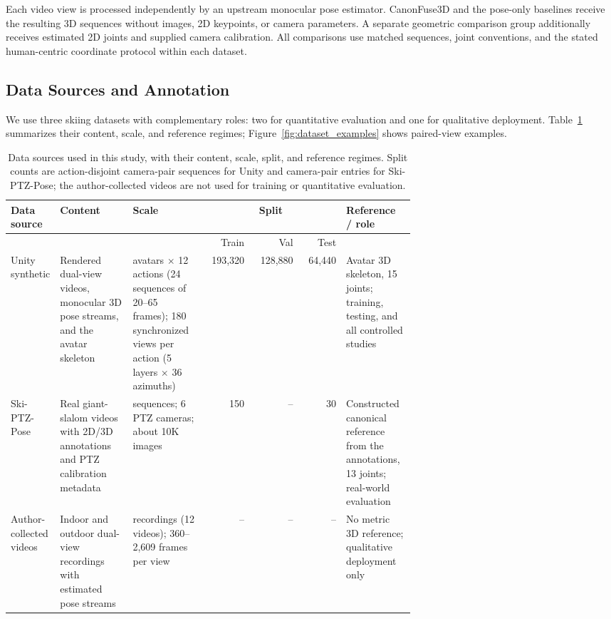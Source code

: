 \documentclass[preprint,12pt]{elsarticle}
\begin{document}
Each video view is processed independently by an upstream monocular pose estimator. CanonFuse3D and the pose-only baselines receive the resulting 3D sequences without images, 2D keypoints, or camera parameters. A separate geometric comparison group additionally receives estimated 2D joints and supplied camera calibration. All comparisons use matched sequences, joint conventions, and the stated human-centric coordinate protocol within each dataset.

\subsection{Data Sources and Annotation}
\label{subsec:dataset_annotation}

We use three skiing datasets with complementary roles: two for quantitative evaluation and one for qualitative deployment. Table~\ref{tab:dataset_summary} summarizes their content, scale, and reference regimes; Figure~\ref{fig:dataset_examples} shows paired-view examples.

\begin{table}[!htb]
\centering
\caption{Data sources used in this study, with their content, scale, split, and reference regimes. Split counts are action-disjoint camera-pair sequences for Unity and camera-pair entries for Ski-PTZ-Pose; the author-collected videos are not used for training or quantitative evaluation.}
\label{tab:dataset_summary}
\footnotesize
\setlength{\tabcolsep}{3pt}
\renewcommand{\arraystretch}{1.08}
\begin{tabular}{@{}>{\raggedright\arraybackslash}p{0.125\linewidth}
                >{\raggedright\arraybackslash}p{0.18\linewidth}
                >{\raggedright\arraybackslash}p{0.18\linewidth}
                rrr
                >{\raggedright\arraybackslash}p{0.17\linewidth}@{}}
\toprule
Data source & Content & Scale & \multicolumn{3}{c}{Split} & Reference / role \\
\cmidrule(lr){4-6} & & & Train & Val & Test & \\
\midrule
Unity synthetic & Rendered dual-view videos, monocular 3D pose streams, and the avatar skeleton & 2 avatars \(\times\) 12 actions (24 sequences of 20--65 frames); 180 synchronized views per action (5 layers \(\times\) 36 azimuths) & 193,320 & 128,880 & 64,440 & Avatar 3D skeleton, 15 joints; training, testing, and all controlled studies \\
\midrule
Ski-PTZ-Pose & Real giant-slalom videos with 2D/3D annotations and PTZ calibration metadata & 12 sequences; 6 PTZ cameras; about 10K images & 150 & -- & 30 & Constructed canonical reference from the annotations, 13 joints; real-world evaluation \\
\midrule
Author-collected videos & Indoor and outdoor dual-view recordings with estimated pose streams & 6 recordings (12 videos); 360--2,609 frames per view & -- & -- & -- & No metric 3D reference; qualitative deployment only \\
\bottomrule
\end{tabular}
\end{table}
\end{document}
